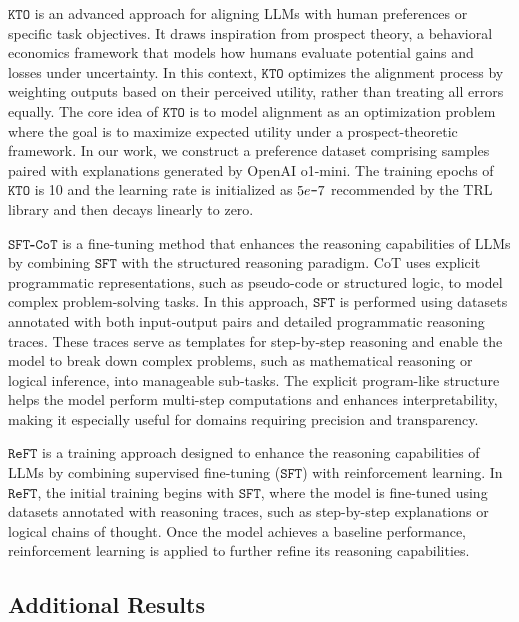 \textbf{$\mathtt{KTO}$} is an advanced approach for aligning LLMs with human preferences or specific task objectives. It draws inspiration from prospect theory, a behavioral economics framework that models how humans evaluate potential gains and losses under uncertainty. In this context, $\mathtt{KTO}$ optimizes the alignment process by weighting outputs based on their perceived utility, rather than treating all errors equally. The core idea of $\mathtt{KTO}$ is to model alignment as an optimization problem where the goal is to maximize expected utility under a prospect-theoretic framework. In our work, we construct a preference dataset comprising samples paired with explanations generated by OpenAI o1-mini. The training epochs of $\mathtt{KTO}$ is 10 and the learning rate is initialized as $5e\textup{\texttt{-}} 7$ recommended by the TRL library and then decays linearly to zero.


\textbf{$\mathtt{SFT}$-$\mathtt{CoT}$} is a fine-tuning method that enhances the reasoning capabilities of LLMs by combining $\mathtt{SFT}$ with the structured reasoning paradigm. CoT uses explicit programmatic representations, such as pseudo-code or structured logic, to model complex problem-solving tasks. In this approach, $\mathtt{SFT}$ is performed using datasets annotated with both input-output pairs and detailed programmatic reasoning traces. These traces serve as templates for step-by-step reasoning and enable the model to break down complex problems, such as mathematical reasoning or logical inference, into manageable sub-tasks. The explicit program-like structure helps the model perform multi-step computations and enhances interpretability, making it especially useful for domains requiring precision and transparency.




\textbf{$\mathtt{ReFT}$} is a training approach designed to enhance the reasoning capabilities of LLMs by combining supervised fine-tuning ($\mathtt{SFT}$) with reinforcement learning. In $\mathtt{ReFT}$, the initial training begins with $\mathtt{SFT}$, where the model is fine-tuned using datasets annotated with reasoning traces, such as step-by-step explanations or logical chains of thought. Once the model achieves a baseline performance, reinforcement learning is applied to further refine its reasoning capabilities. 

\subsection{Additional Results}\label{appx:results}


